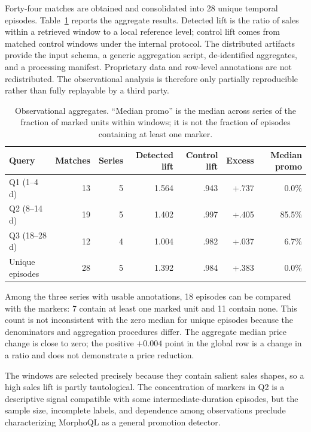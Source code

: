 Forty-four matches are obtained and consolidated into 28 unique temporal episodes. Table~\ref{tab:real-results} reports the aggregate results. Detected lift is the ratio of sales within a retrieved window to a local reference level; control lift comes from matched control windows under the internal protocol. The distributed artifacts provide the input schema, a generic aggregation script, de-identified aggregates, and a processing manifest. Proprietary data and row-level annotations are not redistributed. The observational analysis is therefore only partially reproducible rather than fully replayable by a third party.

\begin{table}[H]
\centering
\caption{Observational aggregates. ``Median promo'' is the median across series of the fraction of marked units within windows; it is not the fraction of episodes containing at least one marker.}
\label{tab:real-results}
\small
\begin{tabular}{lrrrrrr}
\toprule
Query & Matches & Series & Detected lift & Control lift & Excess & Median promo \\
\midrule
Q1 (1--4 d) & 13 & 5 & 1.564 & .943 & +.737 & 0.0\% \\
Q2 (8--14 d) & 19 & 5 & 1.402 & .997 & +.405 & 85.5\% \\
Q3 (18--28 d) & 12 & 4 & 1.004 & .982 & +.037 & 6.7\% \\
Unique episodes & 28 & 5 & 1.392 & .984 & +.383 & 0.0\% \\
\bottomrule
\end{tabular}
\end{table}

Among the three series with usable annotations, 18 episodes can be compared with the markers: 7 contain at least one marked unit and 11 contain none. This count is not inconsistent with the zero median for unique episodes because the denominators and aggregation procedures differ. The aggregate median price change is close to zero; the positive $+0.004$ point in the global row is a change in a ratio and does not demonstrate a price reduction.

The windows are selected precisely because they contain salient sales shapes, so a high sales lift is partly tautological. The concentration of markers in Q2 is a descriptive signal compatible with some intermediate-duration episodes, but the sample size, incomplete labels, and dependence among observations preclude characterizing MorphoQL as a general promotion detector.

